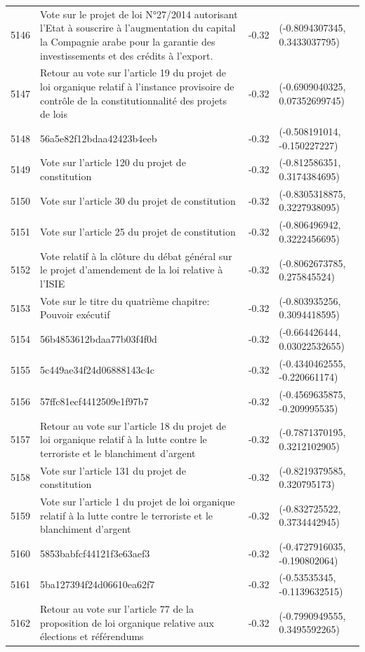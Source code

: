 \begin{table}[ht]
\begin{tabular}{rlrl}
  5146 & Vote sur le projet de loi N°27/2014 autorisant l'Etat à souscrire à l'augmentation du capital la Compagnie arabe pour la garantie des investissements et des crédits à l'export. & -0.32 & (-0.8094307345, 0.3433037795) \\ 
  5147 & Retour au vote sur l'article 19 du projet de loi organique relatif à l'instance provisoire de contrôle de la constitutionnalité des projets de lois & -0.32 & (-0.6909040325, 0.07352699745) \\ 
  5148 & 56a5e82f12bdaa42423b4eeb & -0.32 & (-0.508191014, -0.150227227) \\ 
  5149 & Vote sur l'article 120 du projet de constitution & -0.32 & (-0.812586351, 0.3174384695) \\ 
  5150 & Vote sur l'article 30 du projet de constitution & -0.32 & (-0.8305318875, 0.3227938095) \\ 
  5151 & Vote sur l'article 25 du projet de constitution & -0.32 & (-0.806496942, 0.3222456695) \\ 
  5152 & Vote relatif à la clôture du débat général sur le projet d'amendement de la loi relative à l'ISIE & -0.32 & (-0.8062673785, 0.275845524) \\ 
  5153 & Vote sur le titre du quatrième chapitre: Pouvoir exécutif & -0.32 & (-0.803935256, 0.3094418595) \\ 
  5154 & 56b4853612bdaa77b03f4f0d & -0.32 & (-0.664426444, 0.03022532655) \\ 
  5155 & 5c449ae34f24d06888143c4c & -0.32 & (-0.4340462555, -0.220661174) \\ 
  5156 & 57ffc81ecf4412509e1f97b7 & -0.32 & (-0.4569635875, -0.209995535) \\ 
  5157 & Retour au vote sur l'article 18 du projet de loi organique relatif à la lutte contre le terroriste et le blanchiment d'argent & -0.32 & (-0.7871370195, 0.3212102905) \\ 
  5158 & Vote sur l'article 131 du projet de constitution & -0.32 & (-0.8219379585, 0.320795173) \\ 
  5159 & Vote sur l'article 1 du projet de loi organique relatif à la lutte contre le terroriste et le blanchiment d'argent & -0.32 & (-0.832725522, 0.3734442945) \\ 
  5160 & 5853babfcf44121f3e63aef3 & -0.32 & (-0.4727916035, -0.190802064) \\ 
  5161 & 5ba127394f24d06610ea62f7 & -0.32 & (-0.53535345, -0.1139632515) \\ 
  5162 & Retour au vote sur l'article 77 de la proposition de loi organique relative aux élections et référendums & -0.32 & (-0.7990949555, 0.3495592265) \\ 

\end{tabular}
\end{table}
